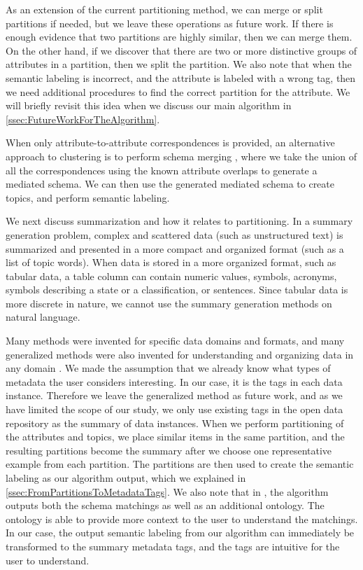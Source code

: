 As an extension of the current partitioning method, we can merge or split partitions if needed, but we leave these operations as future work. If there is enough evidence that two partitions are highly similar, then we can merge them. On the other hand, if we discover that there are two or more distinctive groups of attributes in a partition, then we split the partition. We also note that when the semantic labeling is incorrect, and the attribute is labeled with a wrong tag, then we need additional procedures to find the correct partition for the attribute. We will briefly revisit this idea when we discuss our main algorithm in \autoref{ssec:FutureWorkForTheAlgorithm}.

When only attribute-to-attribute correspondences is provided, an alternative approach to clustering is to perform schema merging \cite{Pottinger2008Schema}, where we take the union of all the correspondences using the known attribute overlaps to generate a mediated schema. We can then use the generated mediated schema to create topics, and perform semantic labeling.

We next discuss summarization and how it relates to partitioning. In a summary generation problem, complex and scattered data (such as unstructured text) is summarized and presented in a more compact and organized format (such as a list of topic words). When data is stored in a more organized format, such as tabular data, a table column can contain numeric values, symbols, acronyms, symbols describing a state or a classification, or sentences. Since tabular data is more discrete in nature, we cannot use the summary generation methods on natural language.

Many methods were invented for specific data domains and formats, and many generalized methods were also invented for understanding and organizing data in any domain \cite{Park2015Evaluation}. We made the assumption that we already know what types of metadata the user considers interesting. In our case, it is the tags in each data instance. Therefore we leave the generalized method as future work, and as we have limited the scope of our study, we only use existing tags in the open data repository as the summary of data instances. When we perform partitioning of the attributes and topics, we place similar items in the same partition, and the resulting partitions become the summary after we choose one representative example from each partition. The partitions are then used to create the semantic labeling as our algorithm output, which we explained in \autoref{ssec:FromPartitionsToMetadataTags}. We also note that in \cite{Diego2018Machine}, the algorithm outputs both the schema matchings as well as an additional ontology. The ontology is able to provide more context to the user to understand the matchings. In our case, the output semantic labeling from our algorithm can immediately be transformed to the summary metadata tags, and the tags are intuitive for the user to understand.

